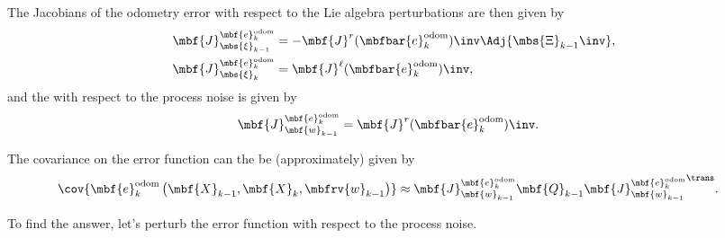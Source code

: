 \documentclass[ nobib, nofonts, notoc]{tufte-handout}
\begin{document}
    The Jacobians of the odometry error with respect to the Lie algebra perturbations are then given by
    \begin{align}
        \mbf{J}
            ^{\mbf{e}
                ^{\mathrm{odom}}
                _{k}}
            _{\mbs{\xi}_{k-1}}
        &=
        -\mbf{J}^{r}(\mbfbar{e}^{\mathrm{odom}}_{k})\inv
        \Adj{\mbs{\Xi}_{k-1}\inv}
        , \\
        \mbf{J}
            ^{\mbf{e}
                ^{\mathrm{odom}}
                _{k}}
            _{\mbs{\xi}_{k}}
        &=
        \mbf{J}^{\ell}(\mbfbar{e}^{\mathrm{odom}}_{k})\inv,
    \end{align}
    and the with respect to the process noise is given by
    \begin{align}
        \mbf{J}
            ^{\mbf{e}
                ^{\mathrm{odom}}
                _{k}}
            _{\mbf{w}_{k-1}}
        &=
        \mbf{J}^{r}(\mbfbar{e}^{\mathrm{odom}}_{k})\inv.
    \end{align}

    The covariance on the error function can the be (approximately) given by
    \begin{align}
        \cov{
            \mbf{e}
                ^{\mathrm{odom}}
                _{k}
            \left(
                \mbf{X}_{k-1},
                \mbf{X}_{k},
                \mbfrv{w}_{k-1}
            \right)
        }
        &\approx
        \mbf{J}
            ^{\mbf{e}
                ^{\mathrm{odom}}
                _{k}}
            _{\mbf{w}_{k-1}}
        \mbf{Q}_{k-1}
        {
        \mbf{J}
            ^{\mbf{e}
                ^{\mathrm{odom}}
                _{k}}
            _{\mbf{w}_{k-1}}
        }^{\trans}.
    \end{align}

    To find the answer, let's perturb the error function with respect to the process noise.
\end{document}

